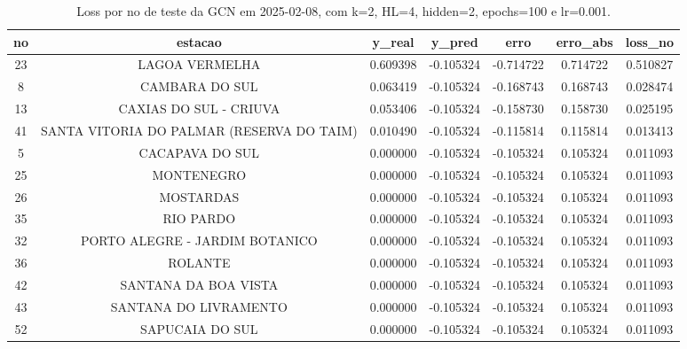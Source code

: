 \begin{table}[h]
\centering
\caption{Loss por no de teste da GCN em 2025-02-08, com k=2, HL=4, hidden=2, epochs=100 e lr=0.001.}
\label{tab:gcn_loss_k2_hl4_h2_e100_d20250208}
\begin{tabular}{ccccccc}
\toprule
no & estacao & y\_real & y\_pred & erro & erro\_abs & loss\_no \\
\midrule
23 & LAGOA VERMELHA & 0.609398 & -0.105324 & -0.714722 & 0.714722 & 0.510827 \\
8 & CAMBARA DO SUL & 0.063419 & -0.105324 & -0.168743 & 0.168743 & 0.028474 \\
13 & CAXIAS DO SUL - CRIUVA & 0.053406 & -0.105324 & -0.158730 & 0.158730 & 0.025195 \\
41 & SANTA VITORIA DO PALMAR (RESERVA DO TAIM) & 0.010490 & -0.105324 & -0.115814 & 0.115814 & 0.013413 \\
5 & CACAPAVA DO SUL & 0.000000 & -0.105324 & -0.105324 & 0.105324 & 0.011093 \\
25 & MONTENEGRO & 0.000000 & -0.105324 & -0.105324 & 0.105324 & 0.011093 \\
26 & MOSTARDAS & 0.000000 & -0.105324 & -0.105324 & 0.105324 & 0.011093 \\
35 & RIO PARDO & 0.000000 & -0.105324 & -0.105324 & 0.105324 & 0.011093 \\
32 & PORTO ALEGRE - JARDIM BOTANICO & 0.000000 & -0.105324 & -0.105324 & 0.105324 & 0.011093 \\
36 & ROLANTE & 0.000000 & -0.105324 & -0.105324 & 0.105324 & 0.011093 \\
42 & SANTANA DA BOA VISTA & 0.000000 & -0.105324 & -0.105324 & 0.105324 & 0.011093 \\
43 & SANTANA DO LIVRAMENTO & 0.000000 & -0.105324 & -0.105324 & 0.105324 & 0.011093 \\
52 & SAPUCAIA DO SUL & 0.000000 & -0.105324 & -0.105324 & 0.105324 & 0.011093 \\
\bottomrule
\end{tabular}
\end{table}
